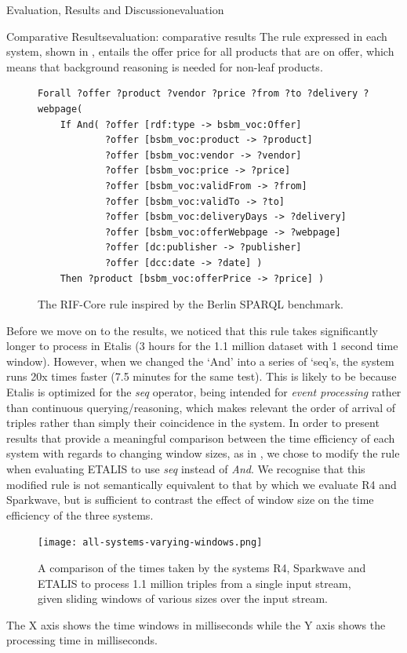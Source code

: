 \begin{nestedsection}{Evaluation, Results and Discussion}{evaluation}
\begin{nestedsection}{Comparative Results}{evaluation: comparative results}
		The rule expressed in each system, shown in , entails the offer price for all products that are on offer, which means that background reasoning is needed for non-leaf products.
		\begin{figure}
			\centering
			\begin{verbatim}
Forall ?offer ?product ?vendor ?price ?from ?to ?delivery ?webpage(
    If And( ?offer [rdf:type -> bsbm_voc:Offer]
            ?offer [bsbm_voc:product -> ?product]
            ?offer [bsbm_voc:vendor -> ?vendor]
            ?offer [bsbm_voc:price -> ?price]
            ?offer [bsbm_voc:validFrom -> ?from]
            ?offer [bsbm_voc:validTo -> ?to]
            ?offer [bsbm_voc:deliveryDays -> ?delivery]
            ?offer [bsbm_voc:offerWebpage -> ?webpage]
            ?offer [dc:publisher -> ?publisher]
            ?offer [dcc:date -> ?date] )
    Then ?product [bsbm_voc:offerPrice -> ?price] )
			\end{verbatim}
			\caption{The RIF-Core rule inspired by the Berlin SPARQL benchmark.}
		\end{figure}
		Before we move on to the results, we noticed that this rule takes significantly longer to process in Etalis (3 hours for the 1.1 million dataset with 1 second time window).
		However, when we changed the `And' into a series of `seq's, the system runs 20x times faster (7.5 minutes for the same test).
		This is likely to be because Etalis is optimized for the \emph{seq} operator, being intended for \emph{event processing} rather than continuous querying/reasoning, which makes relevant the order of arrival of triples rather than simply their coincidence in the system.
		In order to present results that provide a meaningful comparison between the time efficiency of each system with regards to changing window sizes, as in , we chose to modify the rule when evaluating ETALIS to use \emph{seq} instead of \emph{And}.
		We recognise that this modified rule is not semantically equivalent to that by which we evaluate R4 and Sparkwave, but is sufficient to contrast the effect of window size on the time efficiency of the three systems.
		\begin{figure}
			\centering
			\texttt{[image: all-systems-varying-windows.png]}
			\caption{A comparison of the times taken by the systems R4, Sparkwave and ETALIS to process 1.1 million triples from a single input stream, given sliding windows of various sizes over the input stream.}
		\end{figure}
		The X axis shows the time windows in milliseconds while the Y axis shows the processing time in milliseconds.


\end{nestedsection}
\end{nestedsection}

